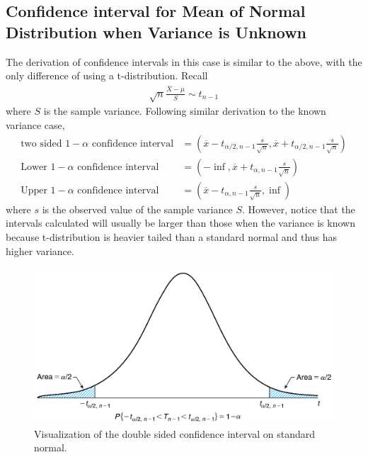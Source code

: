 \documentclass[../probability-notes.tex]{subfiles}
\begin{document}
    \subsection{Confidence interval for Mean of Normal Distribution when Variance is Unknown}
    The derivation of confidence intervals in this case is similar to the above, with the only difference of using a t-distribution. Recall
    \begin{align*}
        \sqrt{n} \frac{\overline{X} - \mu}{S} \sim t_{n-1}
    \end{align*}
    where $S$ is the sample variance. Following similar derivation to the known variance case,
    \begin{align*}
        \text{two sided $1 - \alpha$ confidence interval} &= (\overline{x}-t_{\alpha /2, n-1}\frac{s}{\sqrt{n}}, \overline{x}+t_{\alpha /2, n-1}\frac{s}{\sqrt{n}})\\
        \text{Lower $1-\alpha$ confidence interval} &= (-\inf, \overline{x} + t_{\alpha, n-1}\frac{s}{\sqrt{n}})\\
        \text{Upper $1-\alpha$ confidence interval} &= (\overline{x} - t_{\alpha, n-1}\frac{s}{\sqrt{n}}, \inf)
    \end{align*}
    where $s$ is the observed value of the sample variance $S$. However, notice that the intervals calculated will usually be larger than those when the variance is known because t-distribution is heavier tailed than a standard normal and thus has higher variance.

    \begin{figure}[h]
    \includegraphics[scale=0.3]{../images/conf_2}
    \centering
    \caption{Visualization of the double sided confidence interval on standard normal.}
    \label{fig:conf_2} %
    \end{figure}
\end{document}
